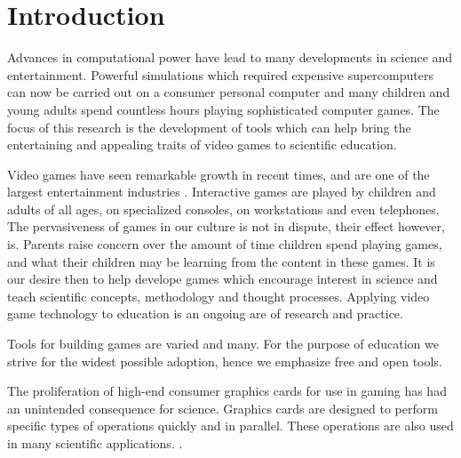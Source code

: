 \chapter{Introduction}

Advances in computational power have lead to many developments in science and
entertainment. Powerful simulations which required expensive supercomputers can
now be carried out on a consumer personal computer and many children and young
adults spend countless hours playing sophisticated computer games. The focus of
this research is the development of tools which can help bring the entertaining
and appealing traits of video games to scientific education.


Video games have seen remarkable growth in recent times, and are one of the
largest entertainment industries \cite{needed}. Interactive games are played by
children and adults of all ages, on specialized consoles, on workstations and
even telephones. The pervasiveness of games in our culture is not in dispute,
their effect however, is. Parents raise concern over the amount of time
children spend playing games, and what their children may be learning from the
content in these games. It is our desire then to help develope games which
encourage interest in science and teach scientific concepts, methodology and
thought processes. Applying video game technology to education is an ongoing
are of research and practice\cite{needed}. 


Tools for building games are varied and many. For the purpose of education we
strive for the widest possible adoption, hence we emphasize free and open
tools. 


The proliferation of high-end consumer graphics cards for use in gaming has had
an unintended consequence for science. Graphics cards are designed to perform
specific types of operations quickly and in parallel. These operations are also
used in many scientific applications.  .\cite{OpenCL}


